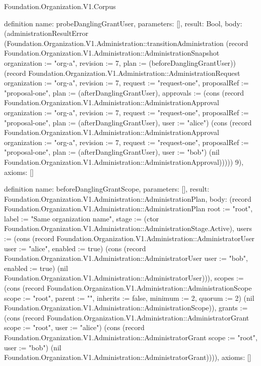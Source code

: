 \begin{lexlean}{Foundation.Organization.V1.Corpus}
\begin{semanticmodule}
definition{
  name: probeDanglingGrantUser,
  parameters: [],
  result: Bool,
  body: (administrationResultError (Foundation.Organization.V1.Administration::transitionAdministration (record Foundation.Organization.V1.Administration::AdministrationSnapshot {organization := "org-a", revision := 7, plan := (beforeDanglingGrantUser)}) (record Foundation.Organization.V1.Administration::AdministrationRequest {organization := "org-a", revision := 7, request := "request-one", proposalRef := "proposal-one", plan := (afterDanglingGrantUser), approvals := (cons (record Foundation.Organization.V1.Administration::AdministrationApproval {organization := "org-a", revision := 7, request := "request-one", proposalRef := "proposal-one", plan := (afterDanglingGrantUser), user := "alice"}) (cons (record Foundation.Organization.V1.Administration::AdministrationApproval {organization := "org-a", revision := 7, request := "request-one", proposalRef := "proposal-one", plan := (afterDanglingGrantUser), user := "bob"}) (nil Foundation.Organization.V1.Administration::AdministrationApproval)))})) 9),
  axioms: []
}

definition{
  name: beforeDanglingGrantScope,
  parameters: [],
  result: Foundation.Organization.V1.Administration::AdministrationPlan,
  body: (record Foundation.Organization.V1.Administration::AdministrationPlan {root := "root", label := "Same organization name", stage := (ctor Foundation.Organization.V1.Administration::AdministrationStage.Active), users := (cons (record Foundation.Organization.V1.Administration::AdministratorUser {user := "alice", enabled := true}) (cons (record Foundation.Organization.V1.Administration::AdministratorUser {user := "bob", enabled := true}) (nil Foundation.Organization.V1.Administration::AdministratorUser))), scopes := (cons (record Foundation.Organization.V1.Administration::AdministrationScope {scope := "root", parent := "", inherits := false, minimum := 2, quorum := 2}) (nil Foundation.Organization.V1.Administration::AdministrationScope)), grants := (cons (record Foundation.Organization.V1.Administration::AdministratorGrant {scope := "root", user := "alice"}) (cons (record Foundation.Organization.V1.Administration::AdministratorGrant {scope := "root", user := "bob"}) (nil Foundation.Organization.V1.Administration::AdministratorGrant)))}),
  axioms: []
}


\end{semanticmodule}
\end{lexlean}
